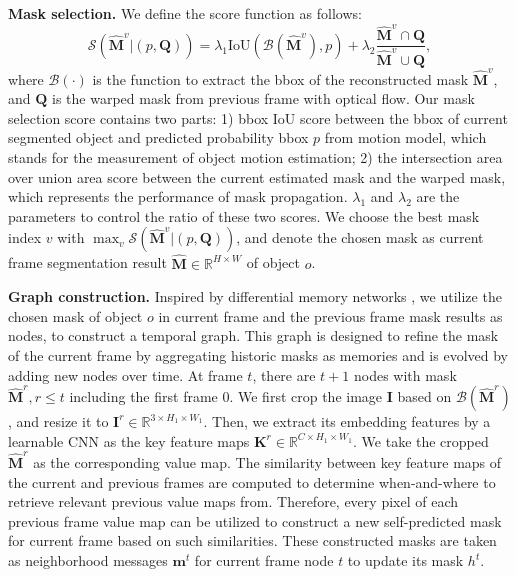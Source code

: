 \documentclass[letterpaper]{article} %
\begin{document}
\noindent \textbf{Mask selection.}
We define the score function as follows:
\begin{equation}
    \mathcal{S}(\widehat{\bm{M}}^{v}|(p,\bm{Q})) = \lambda_1 \text{IoU}(\mathcal{B}(\widehat{\bm{M}}^{v}), p) + \lambda_2 \frac{\widehat{\bm{M}}^{v} \cap \bm{Q}}{\widehat{\bm{M}}^{v} \cup \bm{Q}},
\label{eq:lambda}
\end{equation}
where $\mathcal{B}(\cdot)$ is the function to extract the bbox of the reconstructed mask $\widehat{\bm{M}}^{v}$, and $\bm{Q}$ is the warped mask from previous frame with optical flow. Our mask selection score contains two parts: 1) bbox IoU score between the bbox of current segmented object and predicted probability bbox $p$ from motion model, which stands for the measurement of object motion estimation; 2) the intersection area over union area score between the current estimated mask and the warped mask, which represents the performance of mask propagation. $\lambda_1$ and $\lambda_2$ are the parameters to control the ratio of these two scores. We choose the best mask index $v$ with $\max_{v} \mathcal{S}(\widehat{\bm{M}}^{v}|(p,\bm{Q}))$, and denote the chosen mask as current frame segmentation result $\widehat{\bm{M}} \in \mathbb{R}^{H\times W}$ of object $o$.

\noindent \textbf{Graph construction.}
Inspired by differential memory networks \cite{vaswani2017attention,sukhbaatar2015end}, we utilize the chosen mask of object $o$ in current frame and the previous frame mask results as nodes, to construct a temporal graph. This graph is designed to refine the mask of the current frame by aggregating historic masks as memories and is evolved by adding new nodes over time. At frame $t$, there are $t+1$ nodes with mask $\widehat{\bm{M}}^r,r\leq t$ including the first frame $0$.
We first crop the image $\bm{I}$ based on $\mathcal{B}(\widehat{\bm{M}}^r)$, and resize it to $\bm{I}^r \in \mathbb{R}^{3 \times H_1 \times W_1}$. Then, we
extract its embedding features by a learnable CNN as the key feature maps $\bm{K}^r \in \mathbb{R}^{C \times H_1 \times W_1}$. We take the cropped $\widehat{\bm{M}}^r$ as the corresponding value map.
The similarity between key feature maps of the current and previous frames are computed to determine when-and-where to retrieve relevant previous value maps from. Therefore, every pixel of each previous frame value map can be utilized to construct a new self-predicted mask for current frame based on such similarities. These constructed masks are taken as neighborhood messages $\bm{m}^t$ for current frame node $t$ to update its mask $h^t$.
\end{document}
